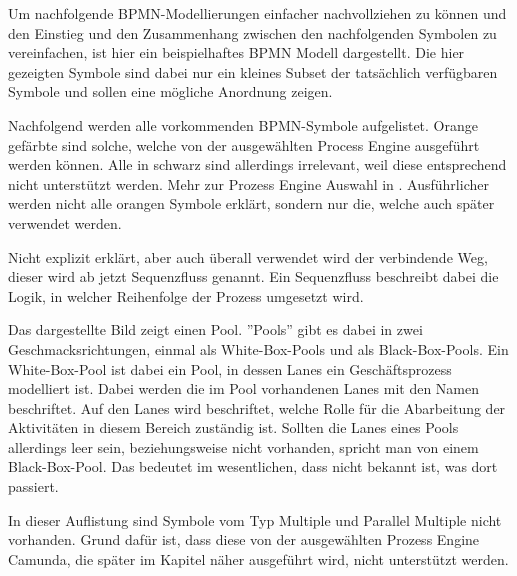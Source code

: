 
Um nachfolgende \ac{BPMN}-Modellierungen einfacher nachvollziehen zu können und den Einstieg und den Zusammenhang zwischen den nachfolgenden Symbolen zu vereinfachen, ist hier ein beispielhaftes \ac{BPMN} Modell dargestellt. Die hier gezeigten Symbole sind dabei nur ein kleines Subset der tatsächlich verfügbaren Symbole und sollen eine mögliche Anordnung zeigen. 

Nachfolgend werden alle vorkommenden \ac{BPMN}-Symbole aufgelistet. Orange gefärbte sind solche, welche von der ausgewählten Process Engine ausgeführt werden können. Alle in schwarz sind allerdings irrelevant, weil diese entsprechend nicht unterstützt werden. Mehr zur Prozess Engine Auswahl in . Ausführlicher werden nicht alle orangen Symbole erklärt, sondern nur die, welche auch später verwendet werden.

Nicht explizit erklärt, aber auch überall verwendet wird der verbindende Weg,  dieser wird ab jetzt Sequenzfluss genannt. Ein Sequenzfluss beschreibt dabei die Logik, in welcher Reihenfolge der Prozess umgesetzt wird. \citep[vgl.][S. 13]{bruce_englisch_2011} 

Das dargestellte Bild zeigt einen Pool. ''Pools'' gibt es dabei in zwei Geschmacksrichtungen, einmal als  White-Box-Pools und als Black-Box-Pools. Ein White-Box-Pool ist dabei ein Pool, in dessen Lanes ein Geschäftsprozess modelliert ist. Dabei werden die im Pool vorhandenen Lanes mit den Namen beschriftet. Auf den Lanes wird beschriftet, welche Rolle für die Abarbeitung der Aktivitäten in diesem Bereich zuständig ist. Sollten die Lanes eines Pools allerdings leer sein, beziehungsweise nicht vorhanden, spricht man von einem Black-Box-Pool. Das bedeutet im wesentlichen, dass nicht bekannt ist, was dort passiert. \citep[vgl.][S. 55]{bruce_bpmn_2012}


In dieser Auflistung sind Symbole vom Typ Multiple und Parallel Multiple nicht vorhanden. Grund dafür ist, dass diese von der ausgewählten Prozess Engine Camunda, die später im Kapitel  näher ausgeführt wird, nicht unterstützt werden.

